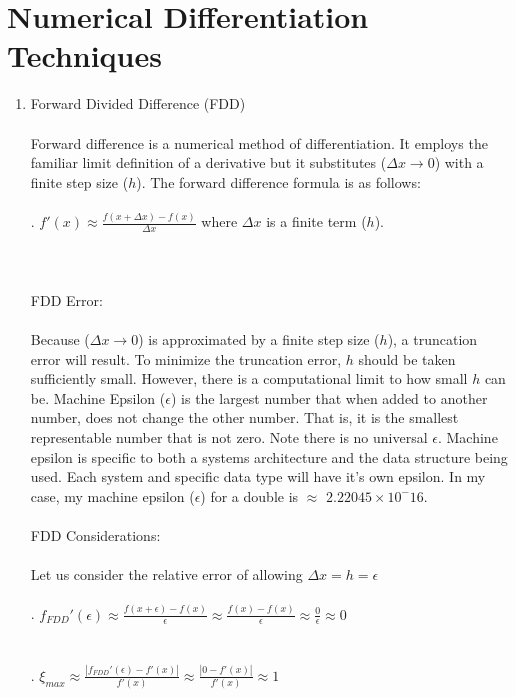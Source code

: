 \documentclass{report}
\begin{document}
\section{Numerical Differentiation Techniques}
\begin{enumerate}
\item Forward Divided Difference (FDD)
\\
\\
Forward difference is a numerical method of differentiation. It employs the familiar limit definition of a derivative but it substitutes ($\Delta x \rightarrow 0$) with a finite step size ($h$). The forward difference formula is as follows:
\\
\\
. \hspace{7 mm} $\displaystyle f'(x) \approx \frac{f(x+\Delta x)-f(x)}{\Delta x}$ where $\Delta x$ is a finite term ($h$).
\\
\\
\\
\\
FDD Error:
\\
\\Because ($\Delta x \rightarrow 0$) is approximated by a finite step size ($h$), a truncation error will result. To minimize the truncation error, $h$ should be taken sufficiently small. However, there is a computational limit to how small $h$ can be. Machine Epsilon ($\epsilon$) is the largest number that when added to another number, does not change the other number. That is, it is the smallest representable number that is not zero. Note there is no universal $\epsilon$. Machine epsilon is specific to both a systems architecture and the data structure being used. Each system and specific data type will have it's own epsilon. In my case, my machine epsilon ($\epsilon$) for a double is $\approx$ $2.22045\times10^-16$. 
\\
\\FDD Considerations:
\\
\\ Let us consider the relative error of allowing $\Delta x = h = \epsilon$
\\
\\
. \hspace{15 mm} $\displaystyle f_{FDD}'(\epsilon) \approx \frac{f(x+\epsilon)-f(x)}{\epsilon} \approx \frac{f(x)-f(x)}{\epsilon} \approx \frac{0}{\epsilon} \approx 0$
\\ 
\\
\\. \hspace{15 mm}$\displaystyle\xi_{max} \approx \frac{\left|f_{FDD}'(\epsilon)-f'(x)\right|}{f'(x)} \approx \frac{\left|0-f'(x)\right|}{f'(x)} \approx 1$ 

\end{enumerate}
\end{document}
